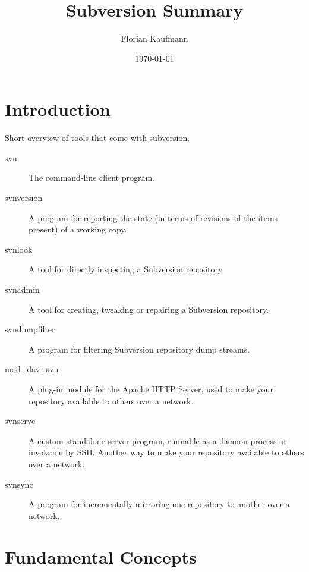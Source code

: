 \documentclass[a4paper]{report}
\begin{document}
\author{Florian Kaufmann}
\title{Subversion Summary}
\date{\today}
\maketitle


\tableofcontents

\chapter{Introduction}

Short overview of tools that come with subversion.

\begin{description}
 \item[svn] The command-line client program.           
 \item[svnversion] A program for reporting the state (in terms of revisions
 of the items present) of a working copy.
 \item[svnlook] A tool for directly inspecting a Subversion repository.  
 \item[svnadmin] A tool for creating, tweaking or repairing a Subversion
 repository.
 \item[svndumpfilter] A program for filtering Subversion repository dump
 streams.
 \item[mod_dav_svn] A plug-in module for the Apache HTTP Server, used to make
 your repository available to others over a network.
 \item[svnserve] A custom standalone server program, runnable as a daemon
 process or invokable by SSH. Another way to make your repository
 available to others over a network.
 \item[svnsync] A program for incrementally mirroring one repository to
 another over a network.
\end{description}

\chapter{Fundamental Concepts}
\end{document}
